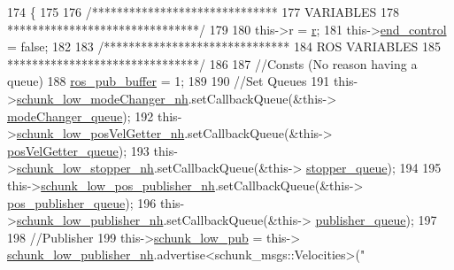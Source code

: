 \begin{DoxyCode}
174                                                                                                            
           \{
175 
176         \textcolor{comment}{/******************************}
177 \textcolor{comment}{                 VARIABLES}
178 \textcolor{comment}{        *******************************/}
179 
180         this->r = \hyperlink{classCartesian__controller_a5562129951bd802e4ded77fc716c87a0}{r};
181         this->\hyperlink{classCartesian__controller_a3c0a72214891f68e2bad63bf2b688f9c}{end\_control} = \textcolor{keyword}{false};
182 
183         \textcolor{comment}{/******************************}
184 \textcolor{comment}{                  ROS VARIABLES}
185 \textcolor{comment}{        *******************************/}
186 
187         \textcolor{comment}{//Consts (No reason having a queue)}
188         \hyperlink{classCartesian__controller_ab9ed5a808da204dbc612d313dc7332f4}{ros\_pub\_buffer} = 1;
189 
190         \textcolor{comment}{//Set Queues}
191         this->\hyperlink{classCartesian__controller_ad90134b232217e84cb58137a9d2030bb}{schunk\_low\_modeChanger\_nh}.setCallbackQueue(&this->
      \hyperlink{classCartesian__controller_adf47dc3a09bd9650015b25870054b60d}{modeChanger\_queue});
192         this->\hyperlink{classCartesian__controller_aeed01809bd5240663c7acfade245a386}{schunk\_low\_posVelGetter\_nh}.setCallbackQueue(&this->
      \hyperlink{classCartesian__controller_a144c7faad45f3d070624452c1f02ba15}{posVelGetter\_queue});
193         this->\hyperlink{classCartesian__controller_a57b1869ec960e75e435e1f882a02d80e}{schunk\_low\_stopper\_nh}.setCallbackQueue(&this->
      \hyperlink{classCartesian__controller_a52eb090400d8dafaa22aecb037788a66}{stopper\_queue});
194 
195         this->\hyperlink{classCartesian__controller_aabe48e7ab08b0235d4cd94213b8faf5d}{schunk\_low\_pos\_publisher\_nh}.setCallbackQueue(&this->
      \hyperlink{classCartesian__controller_adbb9cddf4092cba9042294740c5371eb}{pos\_publisher\_queue});
196         this->\hyperlink{classCartesian__controller_a7df4ce63bf0551bfa7061bc718cd68d2}{schunk\_low\_publisher\_nh}.setCallbackQueue(&this->
      \hyperlink{classCartesian__controller_a041a2eb6657c9b036a512fb21e9f5086}{publisher\_queue});
197 
198         \textcolor{comment}{//Publisher}
199         this->\hyperlink{classCartesian__controller_aa6ce9cffdd307127ed814d6e5132eba2}{schunk\_low\_pub}                       = this->
      \hyperlink{classCartesian__controller_a7df4ce63bf0551bfa7061bc718cd68d2}{schunk\_low\_publisher\_nh}.advertise<schunk\_msgs::Velocities>(\textcolor{stringliteral}{"
}
\end{DoxyCode}
